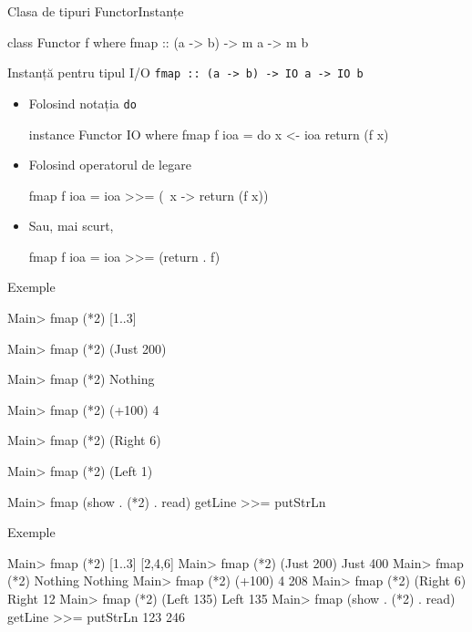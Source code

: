 \documentclass[xcolor=pdftex,romanian,colorlinks]{beamer}
\begin{document}
\begin{frame}[fragile]{Clasa de tipuri Functor}{Instanțe}
\begin{asciihs}
class Functor f where
  fmap :: (a -> b) -> m a -> m b
\end{asciihs}
\vfill
\begin{block}{Instanță pentru tipul I/O \lstinline$fmap :: (a -> b) -> IO a -> IO b$}
\begin{itemize}
\item Folosind notația \lstinline$do$
\begin{asciihs}
instance Functor IO where
  fmap f ioa = do
     x <- ioa
     return (f x)
\end{asciihs}

\item Folosind operatorul de legare
\begin{asciihs}
  fmap f ioa = ioa >>= (\ x -> return (f x))
\end{asciihs}
\item Sau, mai scurt,
\begin{asciihs}
  fmap f ioa = ioa >>= (return . f)
\end{asciihs}
\end{itemize}
\end{block}
\end{frame}

\begin{frame}[fragile]{Exemple}
\begin{asciihs}
Main> fmap (*2) [1..3]

Main> fmap (*2) (Just 200) 

Main> fmap (*2) Nothing  

Main> fmap (*2) (+100) 4

Main> fmap (*2) (Right 6)

Main> fmap (*2) (Left 1)

Main> fmap (show . (*2) . read) getLine  >>=  putStrLn
\end{asciihs}
\end{frame}

\begin{frame}[fragile]{Exemple}
\begin{asciihs}
Main> fmap (*2) [1..3]
[2,4,6]
Main> fmap (*2) (Just 200) 
Just 400
Main> fmap (*2) Nothing  
Nothing
Main> fmap (*2) (+100) 4
208
Main> fmap (*2) (Right 6)
Right 12
Main> fmap (*2) (Left 135)
Left 135
Main> fmap (show . (*2) . read) getLine  >>=  putStrLn
123
246
\end{asciihs}
\end{frame}
\end{document}
